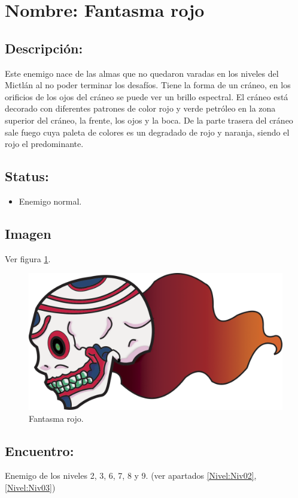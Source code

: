 \section{Nombre: Fantasma rojo}   \label{per:fantasmaR}
\subsection{Descripción:}
Este enemigo nace de las almas que no quedaron varadas en los niveles del Mictlán al no poder terminar los desafíos. Tiene la forma de un cráneo, en los orificios de los ojos del cráneo se puede ver un brillo espectral. El cráneo está decorado con diferentes patrones de color rojo y verde petróleo en la zona superior del cráneo, la frente, los ojos y la boca. De la parte trasera del cráneo sale fuego cuya paleta de colores es un degradado de rojo y naranja, siendo el rojo el predominante. 
\subsection{Status:}
\begin{itemize}
	\item Enemigo normal.
\end{itemize}
\subsection{Imagen}
Ver figura \ref{fig:fantasmaR}.
\begin{figure}
	\centering
	\includegraphics[height=0.2 \textheight]{Imagenes/fantasmaRojo}
	\caption{Fantasma rojo.}
	\label{fig:fantasmaR}
\end{figure} 
\subsection{Encuentro:}
Enemigo de los niveles 2, 3, 6, 7, 8 y 9. (ver apartados \ref{Nivel:Niv02}, \ref{Nivel:Niv03})
